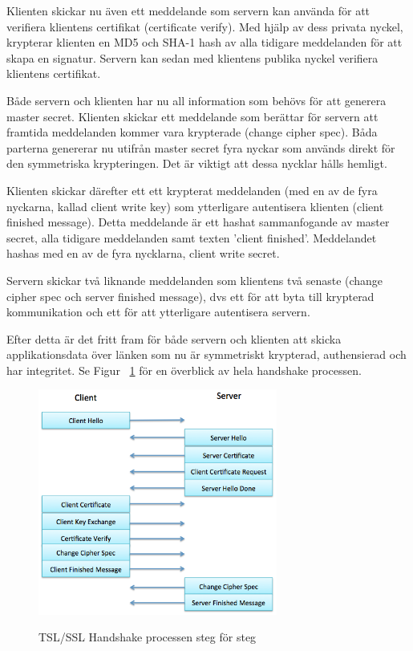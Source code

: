 Klienten skickar nu även ett meddelande som servern kan använda för att verifiera klientens certifikat (certificate verify). Med hjälp av dess privata nyckel, krypterar klienten en MD5 och SHA-1 hash av alla tidigare meddelanden för att skapa en signatur. Servern kan sedan med klientens publika nyckel verifiera klientens certifikat.

Både servern och klienten har nu all information som behövs för att generera master secret. Klienten skickar ett meddelande som berättar för servern att framtida meddelanden kommer vara krypterade (change cipher spec). Båda parterna genererar nu utifrån master secret fyra nyckar som används direkt för den symmetriska krypteringen. Det är viktigt att dessa nycklar hålls hemligt.

Klienten skickar därefter ett ett krypterat meddelanden (med en av de fyra nyckarna, kallad client write key) som ytterligare autentisera klienten (client finished message). Detta meddelande är ett hashat sammanfogande av master secret, alla tidigare meddelanden samt texten 'client finished'. Meddelandet hashas med en av de fyra nycklarna, client write secret.

Servern skickar två liknande meddelanden som klientens två senaste (change cipher spec och server finished message), dvs ett för att byta till krypterad kommunikation och ett för att ytterligare autentisera servern.

Efter detta är det fritt fram för både servern och klienten att skicka applikationsdata över länken som nu är symmetriskt krypterad, authensierad och har integritet. Se Figur ~\ref{fig:handshake} för en överblick av hela handshake processen.

\begin{figure}[tbp]
        \caption{TSL/SSL Handshake processen steg för steg}
        \centering
                \includegraphics[width=0.7\textwidth]{ssl_handshake.png}
        \label{fig:handshake}
\end{figure}